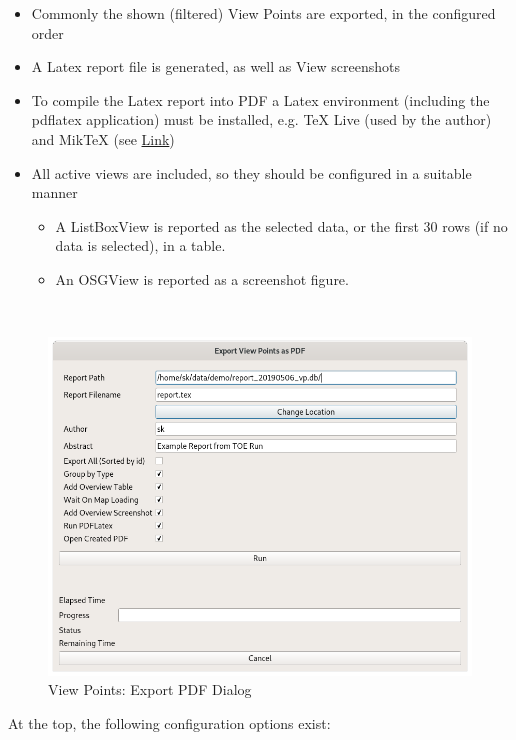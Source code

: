 \begin{itemize}  
\item Commonly the shown (filtered) View Points are exported, in the configured order
\item A Latex report file is generated, as well as View screenshots
\item To compile the Latex report into PDF a Latex environment (including the pdflatex application) must be installed, e.g. TeX Live (used by the author) and MikTeX (see \href{https://en.wikipedia.org/wiki/LaTeX}{Link})
\item All active views are included, so they should be configured in a suitable manner
\begin{itemize}  
\item A ListBoxView is reported as the selected data, or the first 30 rows (if no data is selected), in a table.
\item An OSGView is reported as a screenshot figure.
\end{itemize}
\end{itemize}
\ \\

\begin{figure}[H]
  \centering 
    \includegraphics[width=14cm]{figures/view_points_export_pdf.png}
  \caption{View Points: Export PDF Dialog}
\end{figure}

At the top, the following configuration options exist:

